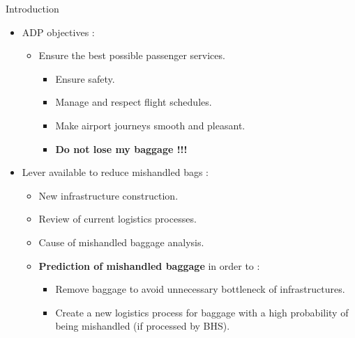 \documentclass{beamer}
\begin{document}
\begin{frame}{Introduction} 
    
    \begin{itemize}
        \item ADP objectives : 
            \begin{itemize}
                \item Ensure the best possible passenger services.
                    \begin{itemize}
                        \item Ensure safety.
                        \item Manage and respect flight schedules.
                        \item Make airport journeys smooth and pleasant.
                        \item \textbf{Do not lose my baggage !!!}
                    \end{itemize}
            \end{itemize}

    \item Lever available to reduce mishandled bags : 
        \begin{itemize}
            \item New infrastructure construction.
            \item Review of current logistics processes.
            \item Cause of mishandled baggage analysis.
            \item \textbf{Prediction of mishandled baggage} in order to : 
                \begin{itemize}
                    \item Remove baggage to avoid unnecessary bottleneck of infrastructures.
                    \item Create a new logistics process for baggage with a high probability of being mishandled (if processed by BHS).
                \end{itemize}
        \end{itemize}

    \end{itemize}
    
\end{frame}
\end{document}
